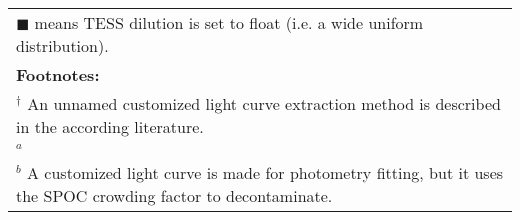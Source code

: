 \begin{longtable}{llrllr}
\multicolumn{6}{l}{$\blacksquare$ means TESS dilution is set to float (i.e. a wide uniform distribution).} \\
\multicolumn{6}{l}{\textbf{Footnotes:}} \\
\multicolumn{6}{l}{$^\dagger$ An unnamed customized light curve extraction method is described in the according literature. } \\
\multicolumn{6}{l}{$^a$ \cite{TASOC}} \\
\multicolumn{6}{l}{$^b$ A customized light curve is made for photometry fitting, but it uses the SPOC crowding factor to decontaminate.} \\
\end{longtable}